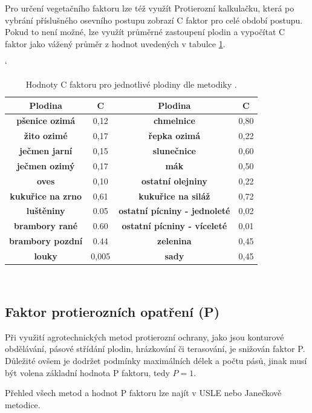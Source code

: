Pro určení vegetačního faktoru lze též využít Protierozní
kalkulačku\cite{kalkulacka}, která po vybrání příslušného osevního
postupu zobrazí C faktor pro celé období postupu.  Pokud to není
možné, lze využít průměrné zastoupení plodin a vypočítat C faktor jako
vážený průměr z hodnot uvedených v tabulce \ref{tabulka_c}.
\begin{table}[!h]
\begin{center}
\catcode`
    \noindent\begin{tabular}{|*{4}{c|}} \hline \bf Plodina & \bf C &
    \bf Plodina & \bf C\\ \hline \bf pšenice ozimá &0,12 &\bf
    chmelnice &0,80\\ \hline \bf žito ozimé &0,17 &\bf řepka ozimá
    &0,22\\ \hline \bf ječmen jarní &0,15 &\bf slunečnice
    &0,60\\ \hline \bf ječmen ozimý &0,17 &\bf mák &0,50\\ \hline \bf
    oves &0,10 &\bf ostatní olejniny &0,22\\ \hline \bf kukuřice na
    zrno&0,61 &\bf kukuřice na siláž &0,72\\ \hline \bf luštěniny
    &0.05 &\bf ostatní pícniny - jednoleté&0,02\\ \hline \bf brambory
    rané &0.60 &\bf ostatní pícniny - víceleté &0,01\\ \hline \bf
    brambory pozdní &0.44 &\bf zelenina &0,45\\ \hline \bf louky
    &0,005 &\bf sady &0,45\\ \hline
    \end{tabular}\\
  \caption[Hodnoty C faktoru pro jednotlivé plodiny]{Hodnoty C faktoru
    pro jednotlivé plodiny dle metodiky \cite{janecek2012}.}
  \label{tabulka_c}
\end{center}
\end{table}
\FloatBarrier
\subsection{Faktor protierozních opatření (P)}
Při využití agrotechnických metod protierozní ochrany, jako jsou
konturové obdělávání, pásové střídání plodin, hrázkování či
terasování, je snižován faktor P. Důležité ovšem je dodržet podmínky
maximálních délek a počtu pásů, jinak musí být volena základní hodnota
P faktoru, tedy $P=1$.

Přehled všech metod a hodnot P faktoru lze najít v USLE\cite{usle1978}
nebo Janečkově metodice\cite{janecek2012}.

